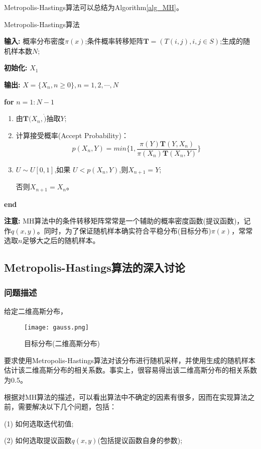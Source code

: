 \documentclass[11pt]{article}
\begin{document}
Metropolis-Hastings算法可以总结为Algorithm\ref{alg_MH}。
\begin{algorithm}[t]
\caption{Metropolis-Hastings算法} 
\textbf{输入:} 概率分布密度$\pi(x)$;条件概率转移矩阵$\mathbf{T} = (T(i,j),i,j\in S)$;生成的随机样本数$N$;

\textbf{初始化:} $X_{1}$

\textbf{输出:} $X=\{X_{n},n\geq 0\},n=1,2,\cdots,N$

\textbf{for} $n=1:N-1$ 
\begin{enumerate} 
  \item 由$\mathbf{T}(X_{n},\dot)$抽取$Y$;
  
  \item 计算接受概率(Accept Probability)：
\[p(X_{n},Y)=min\{1,\frac{\pi(Y)\mathbf{T}(Y,X_{n})}{\pi(X_{n})\mathbf{T}(X_{n},Y)}\}\]

  \item $U\sim U[0,1]$,如果 $U<p(X_{n},Y)$,则$X_{n+1}=Y$;
  
  否则$X_{n+1}=X_{n}$。
\end{enumerate} 
\textbf{end} 
\label{alg_MH}
\end{algorithm}

\textbf{注意:} MH算法中的条件转移矩阵常常是一个辅助的概率密度函数(提议函数)，记作$q(x,y)$。同时，为了保证随机样本确实符合平稳分布(目标分布)$\pi(x)$，常常选取$n$足够大之后的随机样本。

\subsection{Metropolis-Hastings算法的深入讨论}
\subsubsection{问题描述}
给定二维高斯分布，
\begin{figure}[h]
    \centering
    \texttt{[image: gauss.png]}
    \caption{目标分布(二维高斯分布)}
  \end{figure}

要求使用Metropolis-Hastings算法对该分布进行随机采样，并使用生成的随机样本估计该二维高斯分布的相关系数。事实上，很容易得出该二维高斯分布的相关系数为0.5。

根据对MH算法的描述，可以看出算法中不确定的因素有很多，因而在实现算法之前，需要解决以下几个问题，包括：

(1) 如何选取迭代初值;

(2) 如何选取提议函数$q(x,y)$(包括提议函数自身的参数);
\end{document}
